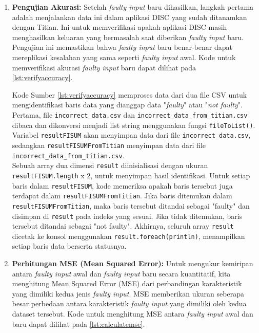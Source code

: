 \begin{enumerate}[topsep=0pt]
    \item \textbf{Pengujian Akurasi:}
    Setelah \emph{faulty input} baru dihasilkan, langkah pertama adalah menjalankan data ini dalam aplikasi DISC yang sudah ditanamkan dengan Titian. Ini untuk memverifikasi apakah aplikasi DISC masih menghasilkan keluaran yang bermasalah saat diberikan \emph{faulty input} baru. Pengujian ini memastikan bahwa \emph{faulty input} baru benar-benar dapat mereplikasi kesalahan yang sama seperti \emph{faulty input} awal.
    Kode untuk memverifikasi akurasi \emph{faulty input} baru dapat dilihat pada \ref{lst:verifyaccuracy}.

    

    Kode Sumber \ref{lst:verifyaccuracy} memproses data dari dua file CSV untuk mengidentifikasi baris data yang dianggap data "\emph{faulty}" atau "\emph{not faulty}". Pertama, file \texttt{incorrect\_data.csv} dan \texttt{incorrect\_data\_from\_titian.csv} dibaca dan dikonversi menjadi list string menggunakan fungsi \texttt{fileToList()}. Variabel \texttt{resultFISUM} akan menyimpan data dari file \texttt{incorrect\_data.csv}, sedangkan \texttt{resultFISUMFromTitian} menyimpan data dari file \texttt{incorrect\_data\_from\_titian.csv}.
    \\

    Sebuah array dua dimensi \texttt{result} diinisialisasi dengan ukuran \texttt{resultFISUM.length} x 2, untuk menyimpan hasil identifikasi. Untuk setiap baris dalam \texttt{resultFISUM}, kode memeriksa apakah baris tersebut juga terdapat dalam \texttt{resultFISUMFromTitian}. Jika baris ditemukan dalam \texttt{resultFISUMFromTitian}, maka baris tersebut ditandai sebagai "faulty" dan disimpan di \texttt{result} pada indeks yang sesuai. Jika tidak ditemukan, baris tersebut ditandai sebagai "not faulty". 
    Akhirnya, seluruh array \texttt{result} dicetak ke konsol menggunakan \texttt{result.foreach(println)}, menampilkan setiap baris data berserta statusnya.


    \item \textbf{Perhitungan MSE (Mean Squared Error):}
      Untuk mengukur kemiripan antara \emph{faulty input} awal dan \emph{faulty input} baru secara kuantitatif, kita menghitung Mean Squared Error (MSE) dari perbandingan karakteristik yang dimiliki kedua jenis \emph{faulty input}. MSE memberikan ukuran seberapa besar perbedaan antara karakteristik \emph{faulty input} yang dimiliki oleh kedua dataset tersebut.
      Kode untuk menghitung MSE antara \emph{faulty input} awal dan baru dapat dilihat pada \ref{lst:calculatemse}.


\end{enumerate}
